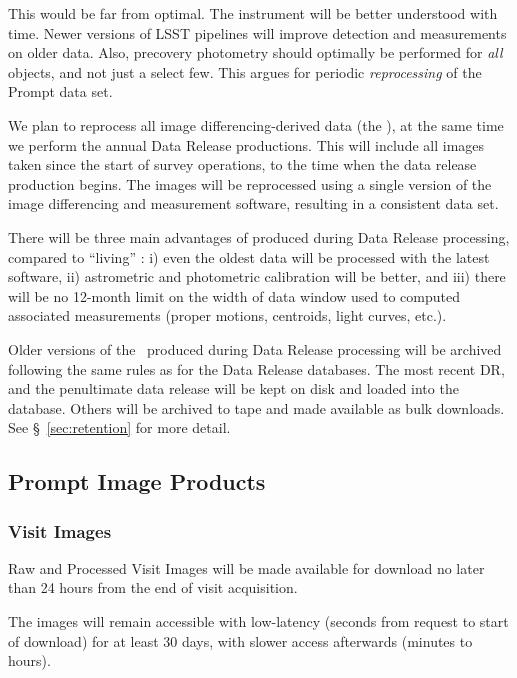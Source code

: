 \documentclass[SE,lsstdraft,toc]{lsstdoc}
\renewcommand{\DR}{{Data Release database}\xspace}
\begin{document}
This would be far from optimal. The instrument will be better understood with time. Newer versions of LSST pipelines will improve detection and measurements on older data. Also, precovery photometry should optimally be performed for \emph{all} objects, and not just a select few. This argues for periodic \emph{reprocessing} of the Prompt data set. 

We plan to reprocess all image differencing-derived data (the \PPDB), at the same time we perform the annual Data Release productions. This will include all images taken since the start of survey operations, to the time when the data release production begins. The images will be reprocessed using a single version of the image differencing and measurement software, resulting in a consistent data set.

There will be three main advantages of \PPDB produced during Data Release processing, compared to
``living'' \PPDB:
i) even the oldest data will be processed with the latest software,
ii) astrometric and photometric calibration will be better, and
iii) there will be no 12-month limit on the width of data window used to computed associated \DIAObject
measurements (proper motions, centroids, light curves, etc.). 

Older versions of the \PPDB\ produced during Data Release processing will be archived following the same rules as for the \DR{}s. The most recent DR, and the penultimate data release will be kept on disk and loaded into the database. Others will be archived to tape and made available as bulk downloads. See \S~\ref{sec:retention} for more detail.

\subsection{Prompt Image Products}

\subsubsection{Visit Images}

Raw and Processed Visit Images will be made available for download no later than 24 hours from the end of visit acquisition.

The images will remain accessible with low-latency (seconds from request to start of download) for at least 30 days, with slower access afterwards (minutes to hours).
\end{document}
